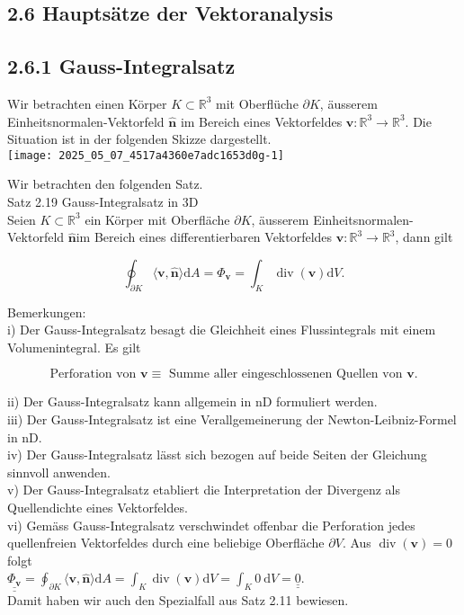 \documentclass[10pt]{article}
\begin{document}
\subsection*{2.6 Hauptsätze der Vektoranalysis}
\subsection*{2.6.1 Gauss-Integralsatz}
Wir betrachten einen Körper $K \subset \mathbb{R}^{3}$ mit Oberflüche $\partial K$, äusserem Einheitsnormalen-Vektorfeld $\hat{\mathbf{n}}$ im Bereich eines Vektorfeldes $\mathbf{v}: \mathbb{R}^{3} \rightarrow \mathbb{R}^{3}$. Die Situation ist in der folgenden Skizze dargestellt.\\
\texttt{[image: 2025\_05\_07\_4517a4360e7adc1653d0g-1]}

Wir betrachten den folgenden Satz.\\
Satz 2.19 Gauss-Integralsatz in 3D\\
Seien $K \subset \mathbb{R}^{3}$ ein Körper mit Oberfläche $\partial K$, äusserem Einheitsnormalen-Vektorfeld $\hat{\mathbf{n}} \mathrm{im}$ Bereich eines differentierbaren Vektorfeldes $\mathbf{v}: \mathbb{R}^{3} \rightarrow \mathbb{R}^{3}$, dann gilt


\begin{equation*}
\oint_{\partial K}\langle\mathbf{v}, \hat{\mathbf{n}}\rangle \mathrm{d} A=\Phi_{\mathbf{v}}=\int_{K} \operatorname{div}(\mathbf{v}) \mathrm{d} V . \tag{2.165}
\end{equation*}


Bemerkungen:\\
i) Der Gauss-Integralsatz besagt die Gleichheit eines Flussintegrals mit einem Volumenintegral. Es gilt


\begin{equation*}
\text { Perforation von } \mathbf{v} \equiv \text { Summe aller eingeschlossenen Quellen von } \mathbf{v} \text {. } \tag{2.166}
\end{equation*}


ii) Der Gauss-Integralsatz kann allgemein in nD formuliert werden.\\
iii) Der Gauss-Integralsatz ist eine Verallgemeinerung der Newton-Leibniz-Formel in nD.\\
iv) Der Gauss-Integralsatz lässt sich bezogen auf beide Seiten der Gleichung sinnvoll anwenden.\\
v) Der Gauss-Integralsatz etabliert die Interpretation der Divergenz als Quellendichte eines Vektorfeldes.\\
vi) Gemäss Gauss-Integralsatz verschwindet offenbar die Perforation jedes quellenfreien Vektorfeldes durch eine beliebige Oberfläche $\partial V$. Aus $\operatorname{div}(\mathbf{v})=0$ folgt\\
$\underline{\underline{\Phi_{\mathbf{v}}}}=\oint_{\partial K}\langle\mathbf{v}, \hat{\mathbf{n}}\rangle \mathrm{d} A=\int_{K} \operatorname{div}(\mathbf{v}) \mathrm{d} V=\int_{K} 0 \mathrm{~d} V=\underline{\underline{0}}$.\\
Damit haben wir auch den Spezialfall aus Satz 2.11 bewiesen.
\end{document}
